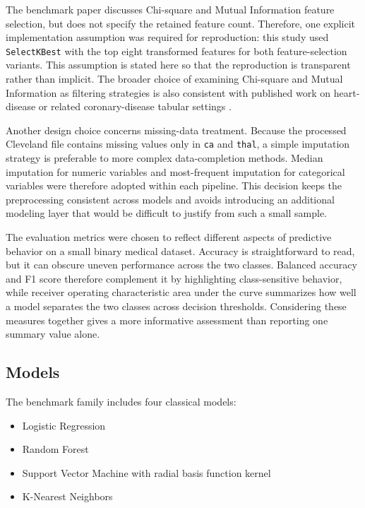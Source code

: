 \documentclass[conference]{IEEEtran}
\begin{document}
The benchmark paper discusses Chi-square and Mutual Information feature selection, but does not specify the retained feature count. Therefore, one explicit implementation assumption was required for reproduction: this study used \texttt{SelectKBest} with the top eight transformed features for both feature-selection variants. This assumption is stated here so that the reproduction is transparent rather than implicit. The broader choice of examining Chi-square and Mutual Information as filtering strategies is also consistent with published work on heart-disease or related coronary-disease tabular settings \cite{spencer2020feature,rehman2025mi}.

Another design choice concerns missing-data treatment. Because the processed Cleveland file contains missing values only in \texttt{ca} and \texttt{thal}, a simple imputation strategy is preferable to more complex data-completion methods. Median imputation for numeric variables and most-frequent imputation for categorical variables were therefore adopted within each pipeline. This decision keeps the preprocessing consistent across models and avoids introducing an additional modeling layer that would be difficult to justify from such a small sample.

The evaluation metrics were chosen to reflect different aspects of predictive behavior on a small binary medical dataset. Accuracy is straightforward to read, but it can obscure uneven performance across the two classes. Balanced accuracy and F1 score therefore complement it by highlighting class-sensitive behavior, while receiver operating characteristic area under the curve summarizes how well a model separates the two classes across decision thresholds. Considering these measures together gives a more informative assessment than reporting one summary value alone.

\subsection{Models}
The benchmark family includes four classical models:
\begin{itemize}
\item Logistic Regression
\item Random Forest
\item Support Vector Machine with radial basis function kernel
\item K-Nearest Neighbors
\end{itemize}
\end{document}
